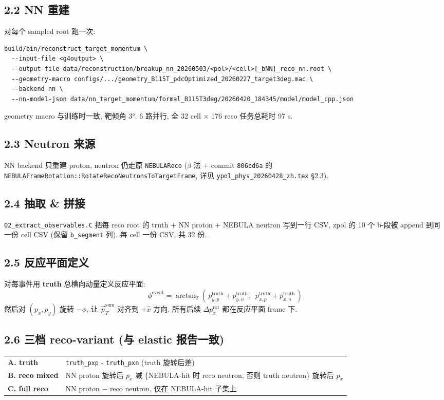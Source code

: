 \documentclass[a4paper,11pt]{article}
\begin{document}
\subsection*{2.2 NN 重建}
对每个 sampled root 跑一次:
\begin{verbatim}
build/bin/reconstruct_target_momentum \
  --input-file <g4output> \
  --output-file data/reconstruction/breakup_nn_20260503/<pol>/<cell>[_bNN]_reco_nn.root \
  --geometry-macro configs/.../geometry_B115T_pdcOptimized_20260227_target3deg.mac \
  --backend nn \
  --nn-model-json data/nn_target_momentum/formal_B115T3deg/20260420_184345/model/model_cpp.json
\end{verbatim}
geometry macro 与训练时一致, 靶倾角 $3°$. 6 路并行, 全 32 cell × 176 reco 任务总耗时 97 s.

\subsection*{2.3 Neutron 来源}
NN backend 只重建 proton, neutron 仍走原 \texttt{NEBULAReco} ($\beta$ 法 + commit \texttt{806cd6a} 的 \texttt{NEBULAFrameRotation::RotateRecoNeutronsToTargetFrame}, 详见 \texttt{ypol\_phys\_20260428\_zh.tex} §2.3).

\subsection*{2.4 抽取 \& 拼接}
\texttt{02\_extract\_observables.C} 把每 reco root 的 truth + NN proton + NEBULA neutron 写到一行 CSV,
zpol 的 10 个 b-段被 append 到同一份 cell CSV (保留 \texttt{b\_segment} 列). 每 cell 一份 CSV, 共 32 份.

\subsection*{2.5 反应平面定义}
对每事件用 \textbf{truth} 总横向动量定义反应平面:
\[
    \phi^\text{event} = \arctan_2(\,p_{y,p}^\text{truth} + p_{y,n}^\text{truth},\;\; p_{x,p}^\text{truth} + p_{x,n}^\text{truth}\,)
\]
然后对 $(p_x, p_y)$ 旋转 $-\phi$, 让 $\vec p_T^\text{sum}$ 对齐到 $+\hat x$ 方向. 所有后续 $\Delta p_x^\text{rot}$ 都在反应平面 frame 下.

\subsection*{2.6 三档 reco-variant (与 elastic 报告一致)}
\begin{tabular}{lp{12cm}}
\toprule
\textbf{A. truth}       & \texttt{truth\_pxp} - \texttt{truth\_pxn} (truth 旋转后差) \\
\textbf{B. reco mixed}  & NN proton 旋转后 $p_x$ 减 \{NEBULA-hit 时 reco neutron, 否则 truth neutron\} 旋转后 $p_x$ \\
\textbf{C. full reco}   & NN proton − reco neutron, 仅在 NEBULA-hit 子集上 \\
\bottomrule
\end{tabular}
\end{document}
